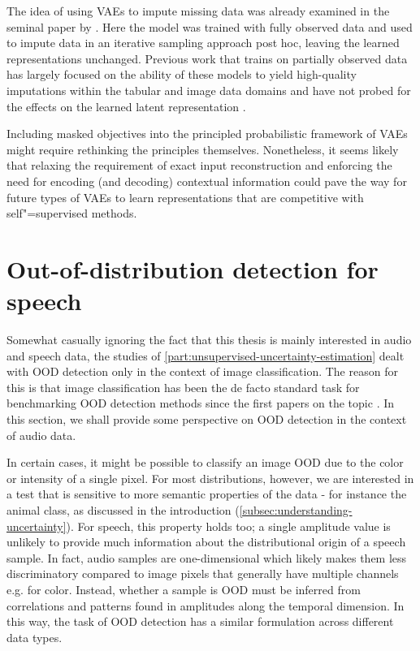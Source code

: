 The idea of using VAEs to impute missing data was already examined in the seminal paper by \textcite{rezende_stochastic_2014}. Here the model was trained with fully observed data and used to impute data in an iterative sampling approach post hoc, leaving the learned representations unchanged.
Previous work that trains on partially observed data has largely focused on the ability of these models to yield high-quality imputations within the tabular and image data domains and have not probed for the effects on the learned latent representation \parencite{mattei_miwae_2019, ipsen_not-miwae_2021}. 

Including masked objectives into the principled probabilistic framework of VAEs might require rethinking the principles themselves. Nonetheless, it seems likely that relaxing the requirement of exact input reconstruction and enforcing the need for encoding (and decoding) contextual information could pave the way for future types of VAEs to learn representations that are competitive with self"=supervised methods.


\section{Out-of-distribution detection for speech}\label{sec_discussion:out-of-distribution-detection-for-speech}
%
%
Somewhat casually ignoring the fact that this thesis is mainly interested in audio and speech data, the studies of \cref{part:unsupervised-uncertainty-estimation} dealt with OOD detection only in the context of image classification. The reason for this is that image classification has been the de facto standard task for benchmarking OOD detection methods since the first papers on the topic \parencite{choi_waic_2019,nalisnick_detecting_2019,hendrycks_deep_2019,kirichenko_why_2020}. 
In this section, we shall provide some perspective on OOD detection in the context of audio data. 

In certain cases, it might be possible to classify an image OOD due to the color or intensity of a single pixel. 
For most distributions, however, we are interested in a test that is sensitive to more semantic properties of the data - for instance the animal class, as discussed in the introduction (\cref{subsec:understanding-uncertainty}). 
For speech, this property holds too; a single amplitude value is unlikely to provide much information about the distributional origin of a speech sample. In fact, audio samples are one-dimensional which likely makes them less discriminatory compared to image pixels that generally have multiple channels e.g. for color. Instead, whether a sample is OOD must be inferred from correlations and patterns found in amplitudes along the temporal dimension. In this way, the task of OOD detection has a similar formulation across different data types. 

